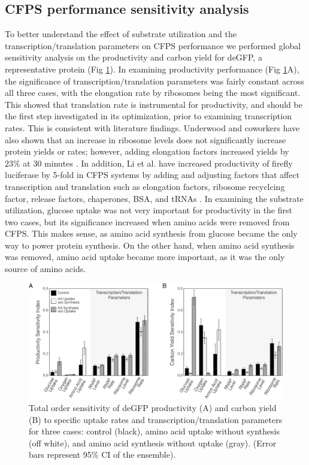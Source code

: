 \documentclass[journal=asbcd6,manuscript=article]{achemso}
\begin{document}
\subsection{CFPS performance sensitivity analysis}
To better understand the effect of substrate utilization and the transcription/translation parameters on CFPS performance we performed global sensitivity analysis on the productivity and carbon yield for deGFP, a representative protein (Fig \ref{fig:SI_GFP}).
In examining productivity performance (Fig \ref{fig:SI_GFP}A), the significance of transcription/translation parameters was fairly constant across all three cases, with the elongation rate by ribosomes being the most significant.
This showed that translation rate is instrumental for productivity, and should be the first step investigated in its optimization, prior to examining transcription rates.
This is consistent with literature findings.
Underwood and coworkers have also shown that an increase in ribosome levels does not significantly increase protein yields or rates; however, adding elongation factors increased yields by 23\% at 30 minutes \cite{2005_underwood_biotech}.
In addition, Li et al. have increased productivity of firefly luciferase by 5-fold in CFPS systems by adding and adjusting factors that affect transcription and translation such as elongation factors, ribosome recyclcing factor, release factors, chaperones, BSA, and tRNAs \cite{2014_li_PlosOne}.
In examining the substrate utilization, glucose uptake was not very important for productivity in the first two cases, but its significance increased when amino acids were removed from CFPS.
This makes sense, as amino acid synthesis from glucose became the only way to power protein synthesis.
On the other hand, when amino acid synthesis was removed, amino acid uptake became more important, as it was the only source of amino acids.
\begin{figure}[t!]
\includegraphics[width=1.00\textwidth]{./Figures/SI_GFP.pdf}
\caption{Total order sensitivity of deGFP productivity (A) and carbon yield (B) to specific uptake rates and transcription/translation parameters for three cases: control (black), amino acid uptake without synthesis (off white), and amino acid synthesis without uptake (gray). (Error bars represent 95\% CI of the ensemble).}
\label{fig:SI_GFP}
\end{figure}
\end{document}
